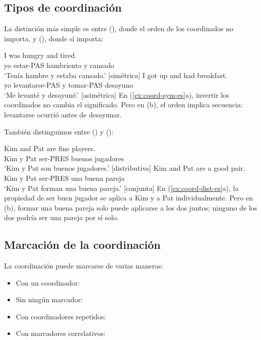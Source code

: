 \subsection{Tipos de coordinación}

La distinción más simple es entre  (), donde el orden de los coordinados no importa, y  (), donde sí importa:

\ea \label{ex:coord-sym-es}
    \ea \gll I was hungry and tired.\\
        yo estar-PAS hambriento y cansado\\
    \glt `Tenía hambre y estaba cansado.' [simétrica]
    \ex \gll I got up and had breakfast.\\
        yo levantarse-PAS y tomar-PAS desayuno\\
    \glt `Me levanté y desayuné.' [asimétrica]
    \z
\z
En (\ref{ex:coord-sym-es}a), invertir los coordinados no cambia el significado. Pero en (b), el orden implica secuencia: levantarse ocurrió antes de desayunar.

También distinguimos entre  () y  ():

\ea \label{ex:coord-dist-es}
    \ea \gll Kim and Pat are fine players.\\
        Kim y Pat ser-PRES buenos jugadores\\
    \glt `Kim y Pat son buenos jugadores.' [distributiva]
    \ex \gll Kim and Pat are a good pair.\\
        Kim y Pat ser-PRES una buena pareja\\
    \glt `Kim y Pat forman una buena pareja.' [conjunta]
    \z
\z
En (\ref{ex:coord-dist-es}a), la propiedad de ser buen jugador se aplica a Kim y a Pat individualmente. Pero en (b), formar una buena pareja solo puede aplicarse a los dos juntos; ninguno de los dos podría ser una pareja por sí solo.

\subsection{Marcación de la coordinación}

La coordinación puede marcarse de varias maneras:
\begin{itemize}[noitemsep]
    \item Con un coordinador: 
    \item Sin ningún marcador: 
    \item Con coordinadores repetidos: 
    \item Con marcadores correlativos: 
\end{itemize}

